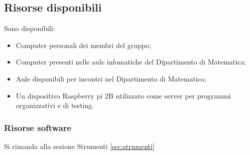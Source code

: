 \subsection{Risorse disponibili}

Sono disponibili:
\begin{itemize}
\item Computer personali dei membri del gruppo;
\item Computer presenti nelle aule infomatiche del Dipartimento di Matematica;
\item Aule disponibili per incontri nel Dipartimento di Matematica;
\item Un dispositivo Raspberry pi 2B utilizzato come server per programmi organizzativi e di testing.

\end{itemize}

\subsubsection{Risorse software}

Si rimanda alla sezione Strumenti \ref{sec:strumenti}


